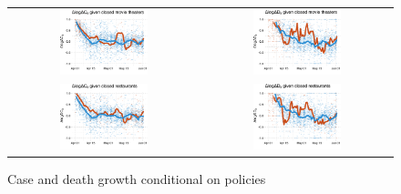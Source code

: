 \documentclass[11pt,reqno,letter]{amsart}
\theoremstyle{definition}
\begin{document}
\begin{figure}
  \caption{Case and death growth conditional on policies \label{fig:growthpolicies2}}
  \begin{minipage}{\linewidth}
    \centering
    \begin{tabular}{cc}
      \includegraphics[width=0.483\textwidth]{tables_and_figures/pmovie-cases}
      &
        \includegraphics[width=0.483\textwidth]{tables_and_figures/pmovie-deaths}
      \\
      \includegraphics[width=0.483\textwidth]{tables_and_figures/prestaurant-cases}
      &
        \includegraphics[width=0.483\textwidth]{tables_and_figures/prestaurant-deaths}

\end{tabular}
\end{minipage}
\end{figure}
\end{document}
